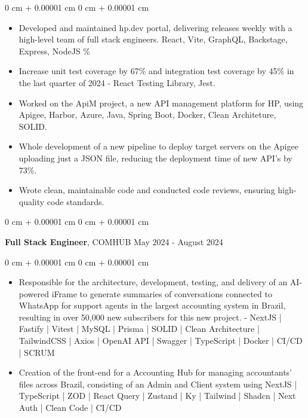 \documentclass[10pt, letterpaper]{article}
\newenvironment{highlights}{ \begin{itemize}[ topsep=0.10 cm, parsep=0.10 cm, partopsep=0pt,
itemsep=0pt, leftmargin=0 cm + 10pt ] }{ \end{itemize} } %
\newenvironment{onecolentry}{ \begin{adjustwidth}{ 0 cm + 0.00001 cm }{ 0 cm + 0.00001 cm }
}{ \end{adjustwidth} } %
\newenvironment{twocolentry}[2][]{ \onecolentry \def\secondColumn{#2} \setcolumnwidth{\fill, 4.5 cm}
\begin{paracol}{2} }{ \switchcolumn \raggedleft \secondColumn \end{paracol}
\endonecolentry } %
\begin{document}
	\vspace{0.10 cm}
	\begin{onecolentry}
		\begin{highlights}
			\item Developed and maintained hp.dev portal, delivering releases weekly with a high-level team of full stack engineers. React, Vite, GraphQL, Backstage, Express, NodeJS \%
			\item Increase unit test coverage by 67\% and integration test coverage by 45\% in the last quarter of 2024 - React Testing Library, Jest.
			\item Worked on the ApiM project, a new API management platform for HP, using Apigee, Harbor, Azure, Java, Spring Boot, Docker, Clean Architeture, SOLID.
            \item Whole development of a new pipeline to deploy target servers on the Apigee uploading just a JSON file, reducing the deployment time of new API's by 73\%.
			\item Wrote clean, maintainable code and conducted code reviews, ensuring high-quality code standards.
		\end{highlights}
	\end{onecolentry}
	
	\vspace{0.2 cm}
	
	\begin{twocolentry}
		{ May 2024 - August 2024 } \textbf{Full Stack Engineer}, COMHUB
	\end{twocolentry}
	
	\vspace{0.10 cm}
	\begin{onecolentry}
		\begin{highlights}
			\item Responsible for the architecture, development, testing, and delivery of an AI-powered iFrame to generate summaries of
            conversations connected to WhatsApp for support agents in the largest accounting system in Brazil, resulting in over 50,000 new
            subscribers for this new project. - NextJS | Fastify | Vitest | MySQL | Prisma | SOLID | Clean Architecture | TailwindCSS | Axios |
            OpenAI API | Swagger | TypeScript | Docker | CI/CD | SCRUM
			\item Creation of the front-end for a Accounting Hub for managing accountants' files across Brazil, consisting of an Admin and Client
            system using NextJS | TypeScript | ZOD | React Query | Zustand | Ky | Tailwind | Shadcn | Next Auth | Clean Code | CI/CD
		\end{highlights}
	\end{onecolentry}
	
\end{document}

